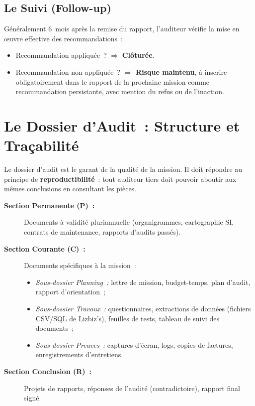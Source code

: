 \subsection{Le Suivi (Follow-up)}
\label{subsec:followup}

Généralement 6~mois après la remise du rapport, l'auditeur vérifie la mise en œuvre
effective des recommandations~:
\begin{itemize}
    \item Recommandation appliquée~? $\Rightarrow$ \textbf{Clôturée}.
    \item Recommandation non appliquée~? $\Rightarrow$ \textbf{Risque maintenu},
        à inscrire obligatoirement dans le rapport de la prochaine mission comme
        recommandation persistante, avec mention du refus ou de l'inaction.
\end{itemize}

\section{Le Dossier d'Audit~: Structure et Traçabilité}
\label{sec:dossier-audit}

Le dossier d'audit est le garant de la qualité de la mission. Il doit répondre au
principe de \textbf{reproductibilité}~: tout auditeur tiers doit pouvoir aboutir aux
mêmes conclusions en consultant les pièces.

\begin{description}
    \item[\textbf{Section Permanente (P)~:}] Documents à validité pluriannuelle
        (organigrammes, cartographie SI, contrats de maintenance, rapports d'audits
        passés).
    \item[\textbf{Section Courante (C)~:}] Documents spécifiques à la mission~:
    \begin{itemize}
        \item \textit{Sous-dossier Planning~:} lettre de mission, budget-temps,
            plan d'audit, rapport d'orientation~;
        \item \textit{Sous-dossier Travaux~:} questionnaires, extractions de données
            (fichiers CSV/SQL de Lizbiz's), feuilles de tests, tableau de suivi des
            documents~;
        \item \textit{Sous-dossier Preuves~:} captures d'écran, logs, copies de
            factures, enregistrements d'entretiens.
    \end{itemize}
    \item[\textbf{Section Conclusion (R)~:}] Projets de rapports, réponses de l'audité
        (contradictoire), rapport final signé.
\end{description}

